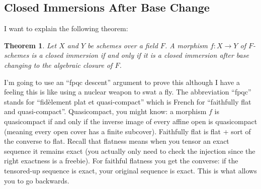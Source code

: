 \documentclass[12pt]{article}
\numberwithin{equation}{section}
\newtheorem{theorem}{Theorem}[subsection]
\theoremstyle{definition}
\theoremstyle{remark}
\begin{document}
\subsection{Closed Immersions After Base Change}

I want to explain the following theorem:
\begin{theorem}
	Let $X$ and $Y$ be schemes over a field $F$.
	A morphism $f:X\to Y$ of $F$-schemes is a closed immersion if and only if it is a closed immersion after base changing to the algebraic closure of $F$.
\end{theorem}
I'm going to use an ``fpqc descent'' argument to prove this although I have a feeling this is like using a nuclear weapon to swat a fly.
The abbreviation ``fpqc'' stands for ``fidèlement plat et quasi-compact'' which is French for ``faithfully flat and quasi-compact''. 
Quasicompact, you might know: a morphism $f$ is quasicompact if and only if the inverse image of every affine open is quasicompact (meaning every open cover has a finite subcover). 
Faithfully flat is flat + sort of the converse to flat. 
Recall that flatness means when you tensor an exact sequence it remains exact (you actually only need to check the injection since the right exactness is a freebie). 
For faithful flatness you get the converse: if the tensored-up sequence is exact, your original sequence is exact. 
This is what allows you to go backwards.
\end{document}
